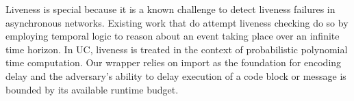 Liveness is special because it is a known challenge to detect liveness failures in asynchronous networks. 
Existing work that do attempt liveness checking do so by employing temporal logic to reason about an event taking place over an infinite time horizon. 
In UC, liveness is treated in the context of probabilistic polynomial time computation.
Our wrapper relies on import as the foundation for encoding delay and the adversary's ability to delay execution of a code block or message is bounded by its available runtime budget. 
%

